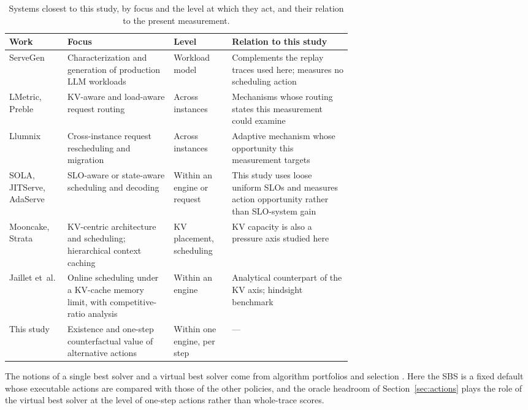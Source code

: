 \documentclass[preprint,12pt]{elsarticle}
\begin{document}
\begin{table}[tbp]
\centering
\footnotesize
\caption{Systems closest to this study, by focus and the level at which they
act, and their relation to the present measurement.}
\label{tab:closest}
\setlength{\tabcolsep}{4pt}
\renewcommand{\arraystretch}{1.15}
\begin{tabularx}{\linewidth}{@{}P{0.17\linewidth}P{0.31\linewidth}P{0.17\linewidth}L@{}}
\toprule
Work & Focus & Level & Relation to this study \\
\midrule
ServeGen~\cite{servegen2025} & Characterization and generation of production LLM workloads & Workload model & Complements the replay traces used here; measures no scheduling action \\
LMetric, Preble \mbox{\cite{lmetric2026,preble2025}} & KV-aware and load-aware request routing & Across instances & Mechanisms whose routing states this measurement could examine \\
Llumnix~\cite{llumnix2024} & Cross-instance request rescheduling and migration & Across instances & Adaptive mechanism whose opportunity this measurement targets \\
SOLA, JITServe, AdaServe \mbox{\cite{sola2025,jitserve2026,adaserve2026}} & SLO-aware or state-aware scheduling and decoding & Within an engine or request & This study uses loose uniform SLOs and measures action opportunity rather than SLO-system gain \\
Mooncake, Strata \mbox{\cite{mooncake2025,strata2025}} & KV-centric architecture and scheduling; hierarchical context caching & KV placement, scheduling & KV capacity is also a pressure axis studied here \\
Jaillet et~al. \mbox{\cite{jaillet2025online}} & Online scheduling under a KV-cache memory limit, with competitive-ratio analysis & Within an engine & Analytical counterpart of the KV axis; hindsight benchmark \\
This study & Existence and one-step counterfactual value of alternative actions & Within one engine, per step & --- \\
\bottomrule
\end{tabularx}
\end{table}

The notions of a single best solver and a virtual best solver come from
algorithm portfolios and selection
\cite{rice1976algorithmselection,gomes2001portfolios,satzilla2008,autofolio2015}.
Here the SBS is a fixed default whose executable actions are compared with those
of the other policies, and the oracle headroom of Section~\ref{sec:actions}
plays the role of the virtual best solver at the level of one-step actions
rather than whole-trace scores.
\end{document}
